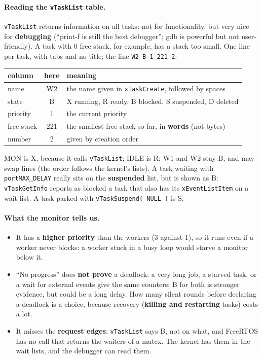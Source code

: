 \paragraph{Reading the \texttt{vTaskList} table.} \texttt{vTaskList} returns information on all tasks: not for functionality, but very nice for \textbf{debugging} (``print-f is still the best debugger''; gdb is powerful but not user-friendly). A task with 0 free stack, for example, has a stack too small. One line per task, with tabs and no title; the line \texttt{W2 B 1 221 2}:
\begin{center}
\small
\begin{tabular}{l c P{0.6}}
    \hline
    \textbf{column} & \textbf{here} & \textbf{meaning} \\
    \hline
    name & W2 & the name given in \texttt{xTaskCreate}, followed by spaces \\
    state & B & X running, R ready, B blocked, S suspended, D deleted \\
    priority & 1 & the current priority \\
    free stack & 221 & the smallest free stack so far, in \textbf{words} (not bytes) \\
    number & 2 & given by creation order \\
    \hline
\end{tabular}
\end{center}
MON is X, because it calls \texttt{vTaskList}; IDLE is R; W1 and W2 stay B, and may swap lines (the order follows the kernel's lists). A task waiting with \texttt{portMAX\_DELAY} really sits on the \textbf{suspended} list, but is shown as B: \texttt{vTaskGetInfo} reports as blocked a task that also has its \texttt{xEventListItem} on a wait list. A task parked with \texttt{vTaskSuspend( NULL )} is S.

\paragraph{What the monitor tells us.}
\begin{itemize}
    \item It has a \textbf{higher priority} than the workers (3 against 1), so it runs even if a worker never blocks: a worker stuck in a busy loop would starve a monitor below it.
    \item ``No progress'' does \textbf{not prove} a deadlock: a very long job, a starved task, or a wait for external events give the same counters; B for both is stronger evidence, but could be a long delay. How many silent rounds before declaring a deadlock is a choice, because recovery (\textbf{killing and restarting} tasks) costs a lot.
    \item It misses the \textbf{request edges}: \texttt{vTaskList} says B, not on what, and FreeRTOS has no call that returns the waiters of a mutex. The kernel has them in the wait lists, and the debugger can read them.
\end{itemize}


